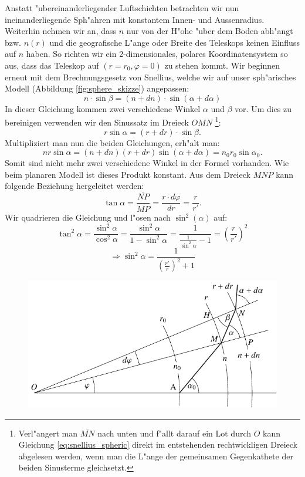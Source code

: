 \begin{refsection}
Anstatt "ubereinanderliegender Luftschichten betrachten wir nun ineinanderliegende Sph"ahren mit konstantem Innen- und Aussenradius.
Weiterhin nehmen wir an, dass $n$ nur von der H"ohe "uber dem Boden abh"angt bzw. $n(r)$ und die geografische L"ange oder Breite des Teleskops keinen Einfluss auf $n$ haben.
So richten wir ein 2-dimensionales, polares Koordinatensystem so aus, dass das Teleskop auf $(r = r_0, \varphi=0)$ zu stehen kommt.
Wir beginnen erneut mit dem Brechnungsgesetz von Snellius, welche wir auf unser sph"arisches Modell (Abbildung \ref{fig:sphere_skizze}) angepassen: 
\begin{equation} \label{eq:snellius_spheric}
n \cdot \sin \beta = (n + dn) \cdot \sin(\alpha + d\alpha)
\end{equation}
In dieser Gleichung kommen zwei verschiedene Winkel $\alpha$ und $\beta$ vor. 
Um dies zu bereinigen verwenden wir den Sinussatz im Dreieck $OMN$
\footnote{Verl"angert man $\overline{MN}$ nach unten und f"allt darauf ein Lot durch $O$ kann Gleichung \ref{eq:snellius_spheric} direkt im entstehenden rechtwickligen Dreieck abgelesen werden, wenn man die L"ange der gemeinsamen Gegenkathete der beiden Sinusterme gleichsetzt.}:
\begin{equation} \label{eq:snellius_spheric2}
r \sin\alpha = (r + dr) \cdot \sin\beta.
\end{equation}
Multipliziert man nun die beiden Gleichungen, erh"alt man:
\begin{equation} \label{eq:sphere_base}
n r \sin \alpha = (n + dn)(r + dr) \sin (\alpha + d\alpha) = n_0 r_0 \sin \alpha_0.
\end{equation}
Somit sind nicht mehr zwei verschiedene Winkel in der Formel vorhanden.
Wie beim planaren Modell ist dieses Produkt konstant.  
Aus dem Dreieck $MNP$ kann folgende Beziehung hergeleitet werden:
$$\tan \alpha =  \frac{\overline{NP}}{\overline{MP}} = \frac{r \cdot d\varphi}{dr} = \frac{r}{r'}.$$
Wir quadrieren die Gleichung und l"osen nach $\sin^2(\alpha)$ auf:
$$\tan^2 \alpha = \frac{\sin^2\alpha}{\cos^2\alpha} = \frac{\sin^2\alpha}{1-\sin^2\alpha} = \frac{1}{\displaystyle\frac{1}{\sin^2\alpha}-1} = \left( \frac{r}{r'} \right)^2$$
\begin{equation} \label{eq:sphere_sine}
\Rightarrow \sin^2\alpha = \frac{1}{\left( \frac{r'}{r} \right)^2 +1}
\end{equation}
\begin{figure} 
\centering
\includegraphics[scale=1]{licht/standalone/fig_sphere_skizze.pdf}

\end{figure}
\end{refsection}
